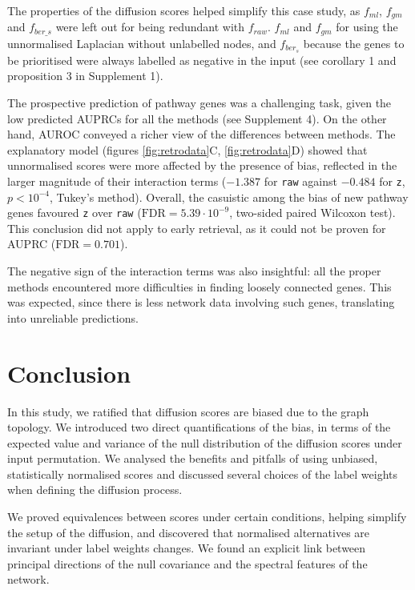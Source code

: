 \documentclass[final]{bioinfo}
\newcommand{\method}{\texttt}
\begin{document}
The properties of the diffusion scores helped simplify this case study, as $f_{ml}$, $f_{gm}$ and $f_{ber\_s}$ were left out for being redundant with $f_{raw}$.
$f_{ml}$ and $f_{gm}$ for using the unnormalised Laplacian without unlabelled nodes, and $f_{ber_s}$ because the genes to be prioritised were always labelled as negative in the input (see corollary 1 and proposition 3 in Supplement 1).

The prospective prediction of pathway genes was a challenging task, given the low predicted AUPRCs for all the methods (see Supplement 4). 
On the other hand, AUROC conveyed a richer view of the differences between methods. 
The explanatory model (figures \ref{fig:retrodata}C, \ref{fig:retrodata}D) showed that unnormalised scores were more affected by the presence of bias, reflected in the larger magnitude of their interaction terms ($-1.387$ for \method{raw} against $-0.484$ for \method{z}, $p<10^{-4}$, Tukey's method). 
Overall, the casuistic among the bias of new pathway genes favoured \method{z} over \method{raw} ($ \textrm{FDR}=5.39\cdot 10^{-9}$, two-sided paired Wilcoxon test). 
This conclusion did not apply to early retrieval, as it could not be proven for AUPRC ($\textrm{FDR} = 0.701$).

The negative sign of the interaction terms was also insightful: all the proper methods encountered more difficulties in finding loosely connected genes.
This was expected, since there is less network data involving such genes, translating into unreliable predictions.

\section*{Conclusion}

In this study, we ratified that diffusion scores are biased due to the graph topology. 
We introduced two direct quantifications of the bias, in terms of the expected value and variance of the null distribution of the diffusion scores under input permutation.
We analysed the benefits and pitfalls of using unbiased, statistically normalised scores and discussed several choices of the label weights when defining the diffusion process. 

We proved equivalences between scores under certain conditions, helping simplify the setup of the diffusion, and discovered that normalised alternatives are invariant under label weights changes. 
We found an explicit link between principal directions of the null covariance and the spectral features of the network.
\end{document}
